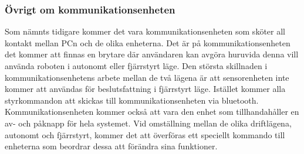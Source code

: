 \subsubsection{Övrigt om kommunikationsenheten}

Som nämnts tidigare kommer det vara kommunikationsenheten som sköter all kontakt mellan PCn och de olika enheterna. Det är på kommunikationsenheten det kommer att finnas en brytare där användaren kan avgöra huruvida denna vill använda roboten i autonomt eller fjärrstyrt läge. Den största skillnaden i kommunikationsenhetens arbete mellan de två lägena är att sensorenheten inte kommer att användas för beslutsfattning i fjärrstyrt läge. Istället kommer alla styrkommandon att skickas till kommunikationsenheten via bluetooth. Kommunikationsenheten kommer också att vara den enhet som tillhandahåller en av- och påknapp för hela systemet.
Vid omställning mellan de olika driftlägena, autonomt och fjärrstyrt, kommer det att överföras ett speciellt kommando till enheterna som beordrar dessa att förändra sina funktioner.  

